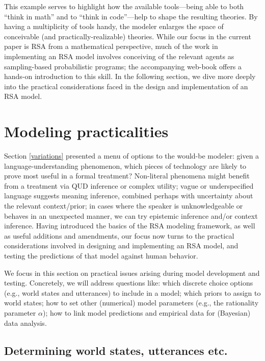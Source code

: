 \documentclass{sp}
\begin{document}
\bigskip

\noindent This example serves to highlight how the available tools---being able to both ``think in math'' and to ``think in code''---help to shape the resulting theories. By having a multiplicity of tools handy, the modeler enlarges the space of conceivable (and practically-realizable) theories. While our focus in the current paper is RSA from a mathematical perspective, much of the work in implementing an RSA model involves conceiving of the relevant agents as sampling-based probabilistic programs; the accompanying web-book offers a hands-on introduction to this skill. In the following section, we dive more deeply into the practical considerations faced in the design and implementation of an RSA model.

\section{Modeling practicalities} \label{practicalities}

Section \ref{variations} presented a menu of options to the would-be modeler: given a language-understanding phenomenon, which pieces of technology are likely to prove most useful in a formal treatment? Non-literal phenomena might benefit from a treatment via QUD inference or complex utility; vague or underspecified language suggests meaning inference, combined perhaps with uncertainty about the relevant context/prior; in cases where the speaker is unknowledgeable or behaves in an unexpected manner, we can try epistemic inference and/or context inference. Having introduced the basics of the RSA modeling framework, as well as useful additions and amendments, our focus now turns to the practical considerations involved in designing and implementing an RSA model, and testing the predictions of that model against human behavior.

We focus in this section on practical issues arising during model development and testing. Concretely, we will address questions like: which discrete choice options (e.g., world states and utterances) to include in a model; which priors to assign to world states; how to set other (numerical) model parameters (e.g., the rationality parameter $\alpha$); how to link model predictions and empirical data for (Bayesian) data analysis.

\subsection{Determining world states, utterances etc.} \label{practicalities-prior}
\end{document}
